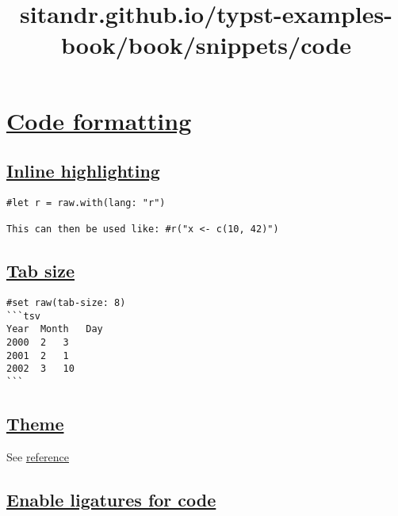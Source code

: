 \pandocbounded{}


\title{sitandr.github.io/typst-examples-book/book/snippets/code}

\section{\texorpdfstring{\hyperref[code-formatting]{Code
formatting}}{Code formatting}}\label{code-formatting}

\subsection{\texorpdfstring{\hyperref[inline-highlighting]{Inline
highlighting}}{Inline highlighting}}\label{inline-highlighting}

\begin{verbatim}
#let r = raw.with(lang: "r")

This can then be used like: #r("x <- c(10, 42)")
\end{verbatim}

\pandocbounded{}

\subsection{\texorpdfstring{\hyperref[tab-size]{Tab
size}}{Tab size}}\label{tab-size}

\begin{verbatim}
#set raw(tab-size: 8)
```tsv
Year  Month   Day
2000  2   3
2001  2   1
2002  3   10
```
\end{verbatim}

\pandocbounded{}

\subsection{\texorpdfstring{\hyperref[theme]{Theme}}{Theme}}\label{theme}

See
\href{https://typst.app/docs/reference/text/raw/\#parameters-theme}{reference}

\subsection{\texorpdfstring{\hyperref[enable-ligatures-for-code]{Enable
ligatures for
code}}{Enable ligatures for code}}\label{enable-ligatures-for-code}

